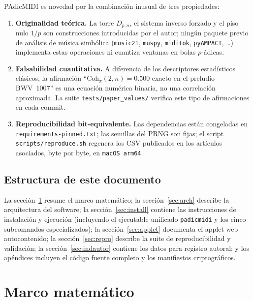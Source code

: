 \documentclass[11pt,a4paper,oneside]{article}
\theoremstyle{plain}
\theoremstyle{definition}
\theoremstyle{remark}
\newcommand{\Dn}{D_{p,n}}
\newcommand{\Cohpi}{\mathrm{Coh}_\pi}
\newcommand{\code}[1]{\texttt{\small #1}}
\begin{document}
PAdicMIDI es novedad por la combinación inusual de tres propiedades:

\begin{enumerate}[itemsep=3pt]
  \item \textbf{Originalidad teórica.} La torre $\Dn$, el sistema
        inverso forzado y el piso nulo $1/p$ son construcciones
        introducidas por el autor; ningún paquete previo de análisis de
        música simbólica (\code{music21}, \code{muspy}, \code{miditok},
        \code{pyAMPACT}, \ldots) implementa estas operaciones ni
        cuantiza ventanas en bolas $p$-ádicas.
  \item \textbf{Falsabilidad cuantitativa.} A diferencia de los
        descriptores estadísticos clásicos, la afirmación
        ``$\Cohpi(2,n) = 0.500$ exacto en el preludio BWV~1007'' es una
        ecuación numérica binaria, no una correlación aproximada. La
        suite \code{tests/paper\_values/} verifica este tipo de
        afirmaciones en cada commit.
  \item \textbf{Reproducibilidad bit-equivalente.} Las dependencias
        están congeladas en \code{requirements-pinned.txt}; las semillas
        del PRNG son fijas; el script \code{scripts/reproduce.sh}
        regenera los CSV publicados en los artículos asociados, byte por
        byte, en \code{macOS arm64}.
\end{enumerate}

\subsection{Estructura de este documento}

La sección~\ref{sec:math} resume el marco matemático; la
sección~\ref{sec:arch} describe la arquitectura del software; la
sección~\ref{sec:install} contiene las instrucciones de instalación y
ejecución (incluyendo el ejecutable unificado \code{padicmidi} y los
cinco subcomandos especializados); la sección~\ref{sec:applet}
documenta el applet web autocontenido; la sección~\ref{sec:repro}
describe la suite de reproducibilidad y validación; la
sección~\ref{sec:indautor} contiene los datos para registro autoral; y
los apéndices incluyen el código fuente completo y los manifiestos
criptográficos.

\section{Marco matemático}\label{sec:math}
\end{document}
